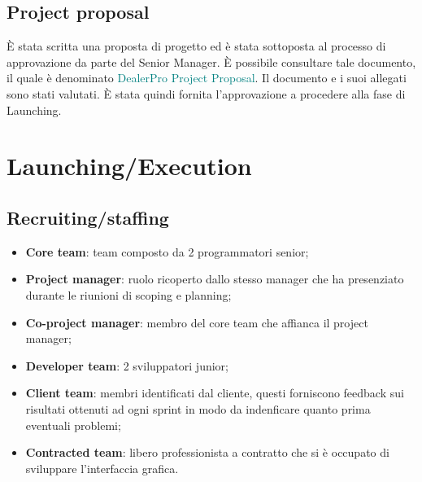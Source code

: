 \documentclass{article}
\begin{document}
  \subsection{Project proposal}
  È stata scritta una proposta di progetto ed è stata sottoposta al processo di approvazione da parte del Senior Manager. 
  È possibile consultare tale documento, il quale è denominato  \textcolor{teal}{DealerPro Project Proposal}.
  Il documento e i suoi allegati sono stati valutati. È stata quindi fornita l’approvazione a procedere alla fase
  di Launching.


  \newpage
  \section{Launching/Execution}

  \subsection{Recruiting/staffing}

  \begin{itemize}
    \item \textbf{Core team}: team composto da 2 programmatori senior;
    \item \textbf{Project manager}: ruolo ricoperto dallo stesso manager che ha presenziato 
      durante le riunioni di scoping e planning;
    \item \textbf{Co-project manager}: membro del core team che affianca il project manager;
    \item \textbf{Developer team}: 2 sviluppatori junior;
    \item \textbf{Client team}: membri identificati dal cliente, questi forniscono feedback sui 
      risultati ottenuti ad ogni sprint in modo da indenficare quanto prima eventuali problemi;
    \item \textbf{Contracted team}: libero professionista a contratto che si è occupato di 
      sviluppare l'interfaccia grafica.
  \end{itemize}
\end{document}
